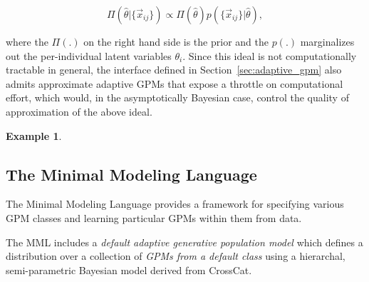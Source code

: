 \documentclass[10pt,letterpaper]{article}
\newtheorem{example}{Example}[section]
\begin{document}
\[ \Pi(\hat\theta|\{\vec{x}_{ij}\}) \propto \Pi(\hat\theta) p(\{\vec{x}_{ij}\}|\hat\theta), \]

where the $\Pi(.)$ on the right hand side is the prior and the $p(.)$
marginalizes out the per-individual latent variables $\theta_i$.
Since this ideal is not computationally tractable in general, the
interface defined in Section~\ref{sec:adaptive_gpm} also admits
approximate adaptive GPMs that expose a throttle on computational
effort, which would, in the asymptotically Bayesian case, control the
quality of approximation of the above ideal.

\begin{example}
\end{example}

\subsection{The Minimal Modeling Language}

The Minimal Modeling Language provides a
framework for specifying various GPM classes and learning particular GPMs
within them from data.

The MML includes a \textit{default adaptive generative population model} which defines a
distribution over a collection of \textit{GPMs from a default class} using a
hierarchal, semi-parametric Bayesian model derived from CrossCat.
\end{document}
